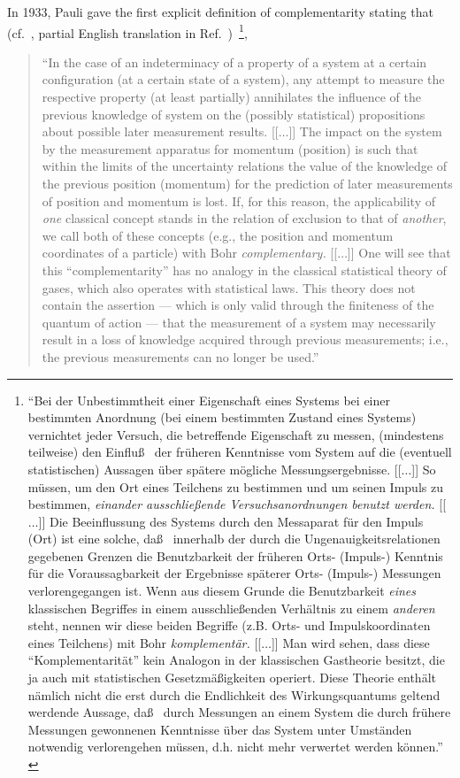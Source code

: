 \documentclass[10pt]{article}%
\begin{document}
In 1933, Pauli gave the first explicit definition of complementarity stating that (cf.~\cite[p.~7]{pauli:58},
partial English translation in Ref.~\cite[p.~369]{jammer:89})~\footnote{
{  ``Bei der Unbestimmtheit einer Eigenschaft eines Systems bei einer bestimmten Anordnung
(bei einem bestimmten Zustand eines Systems) vernichtet jeder Versuch, die betreffende Eigenschaft zu messen,
(mindestens teilweise) den Einflu\ss~
der fr{\"u}heren Kenntnisse vom System auf die (eventuell statistischen) Aussagen
{\"u}ber sp{\"a}tere m{\"o}gliche Messungsergebnisse.
[[$\ldots$]]
So m{\"u}ssen, um den Ort eines Teilchens zu bestimmen und um seinen Impuls zu bestimmen,
{\em einander ausschlie\ss ende Versuchsanordnungen benutzt werden.}
[[$\ldots$]]
Die Beeinflussung des Systems durch den Messaparat f{\"u}r den Impuls (Ort)
ist eine solche, da\ss~ innerhalb der durch die Ungenauigkeitsrelationen gegebenen Grenzen
die Benutzbarkeit der fr{\"u}heren Orts- (Impuls-)
Kenntnis f{\"u}r die Voraussagbarkeit der Ergebnisse sp{\"a}terer Orts- (Impuls-) Messungen verlorengegangen ist.
Wenn aus diesem Grunde die Benutzbarkeit {\em eines} klassischen Begriffes in einem
ausschlie\ss enden Verh{\"a}ltnis zu einem {\em anderen} steht, nennen wir diese beiden Begriffe (z.B. Orts- und
Impulskoordinaten eines Teilchens) mit Bohr {\em komplement{\"a}r.}
[[$\ldots$]]
Man wird sehen, dass diese ``Komplementarit{\"a}t'' kein Analogon in
der klassischen Gastheorie besitzt, die ja auch mit statistischen
Gesetzm\"a\ss igkeiten operiert.
Diese Theorie enth{\"a}lt n{\"a}mlich nicht die erst durch die Endlichkeit des Wirkungsquantums
geltend werdende Aussage, da\ss~ durch Messungen an einem System die durch fr{\"u}here Messungen gewonnenen Kenntnisse
{\"u}ber das System unter Umst{\"a}nden notwendig verlorengehen m{\"u}ssen, d.h. nicht mehr verwertet werden k{\"o}nnen.''
}
},
\begin{quote}
{  ``In the case of  an indeterminacy of a property of a system at a certain configuration
(at a certain state of a system), any attempt to measure the respective property (at least partially)
annihilates the influence of the previous knowledge of system on the (possibly statistical) propositions
about possible later measurement results.
[[$\ldots$]]
The impact
on the system by the  measurement apparatus for momentum (position) is such that
within the limits of the uncertainty relations
the value of the knowledge of the previous position (momentum) for the
prediction of later measurements of position and momentum is lost.
If, for this reason, the applicability of {\em one} classical concept stands in the relation of
exclusion to that of {\em another}, we call both of these
concepts (e.g., the position and momentum coordinates of a particle) with Bohr {\em complementary.}
[[$\ldots$]]
One will see that this ``complementarity''
has no analogy in the classical statistical theory of gases,
which also operates with statistical laws.
This theory does not contain the assertion --- which is only valid through the finiteness of the
quantum of action --- that the measurement of a system may necessarily result in a loss
of knowledge acquired through previous measurements; i.e., the previous
measurements can no longer be used.''
}
\end{quote}
\end{document}
